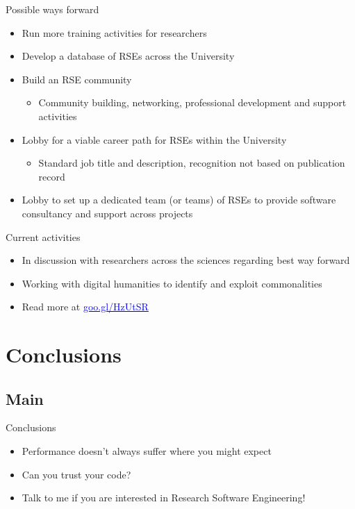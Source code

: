 \documentclass[t,xcolor={usenames,dvipsnames}]{beamer}
\newcommand{\myhref}[2]{\href{#1}{\textcolor{Blue}{#2}}}
\newcommand{\subitem}[1]{\begin{itemize}[<.->]\item #1 \end{itemize}}
\begin{document}
\begin{frame}{Possible ways forward}
\begin{itemize}
\item Run more training activities for researchers
\item Develop a database of RSEs across the University
\item Build an RSE community
  \subitem{Community building, networking, professional development and support activities}
\item Lobby for a viable career path for RSEs within the University
  \subitem{Standard job title and description, recognition not based on publication record}
\item Lobby to set up a dedicated team (or teams) of RSEs to provide software consultancy and support across projects
\end{itemize}
\end{frame}

\begin{frame}{Current activities}
\begin{itemize}
\item In discussion with researchers across the sciences regarding best way forward
\item Working with digital humanities to identify and exploit commonalities
\item Read more at \myhref{http://goo.gl/HzUtSR}{goo.gl/HzUtSR}
\end{itemize}
\end{frame}

\section{Conclusions}
\subsection*{Main}

\begin{frame}{Conclusions}
\begin{itemize}
\item Performance doesn't always suffer where you might expect
\item Can you trust your code?
\item Talk to me if you are interested in Research Software Engineering!
\end{itemize}
\end{frame}
\end{document}
